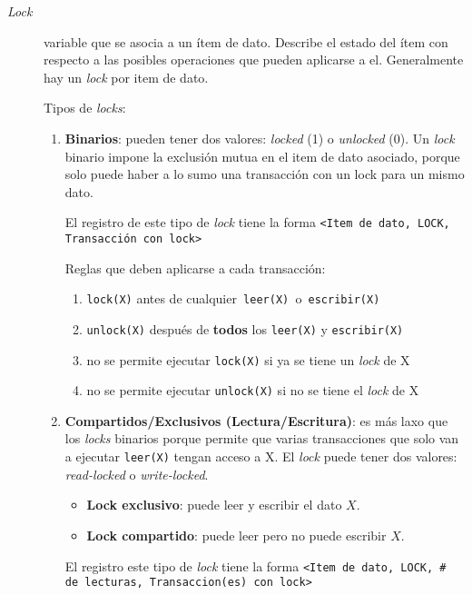 \documentclass[a4paper, twoside]{article}
\begin{document}
\begin{description}
\item [{\emph{Lock}}] variable que se asocia a un ítem de dato. Describe
el estado del ítem con respecto a las posibles operaciones que pueden
aplicarse a el. Generalmente hay un \emph{lock} por item de dato.


Tipos de \emph{locks}:
\begin{enumerate}
\item \textbf{Binarios}: pueden tener dos valores: \emph{locked} (1) o \emph{unlocked}
(0). Un \emph{lock} binario impone la exclusión mutua en el item de
dato asociado, porque solo puede haber a lo sumo una transacción con
un lock para un mismo dato.


El registro de este tipo de \emph{lock} tiene la forma \texttt{<Item
de dato, LOCK, Transacción con lock>}


Reglas que deben aplicarse a cada transacción:
\begin{enumerate}
\item \texttt{lock(X)} antes de cualquier\texttt{ leer(X) }o\texttt{ escribir(X)}
\item \texttt{unlock(X)} después de \textbf{todos} los \texttt{leer(X)}
y \texttt{escribir(X)}
\item no se permite ejecutar \texttt{lock(X)} si ya se tiene un \emph{lock}
de X
\item no se permite ejecutar \texttt{unlock(X)} si no se tiene el \emph{lock}
de X
\end{enumerate}
\item \textbf{Compartidos/Exclusivos (Lectura/Escritura)}: es más laxo que
los \emph{locks} binarios porque permite que varias transacciones
que solo van a ejecutar \texttt{leer(X)} tengan acceso a X. El \emph{lock}
puede tener dos valores: \emph{read-locked }o \emph{write-locked}.

\begin{itemize}
\item \textbf{Lock exclusivo}: puede leer y escribir el dato $X$.
\item \textbf{Lock compartido}: puede leer pero no puede escribir $X$.
\end{itemize}

El registro este tipo de \emph{lock} tiene la forma \texttt{<Item
de dato, LOCK, \# de lecturas, Transaccion(es) con lock>}



\end{enumerate}
\end{description}
\end{document}
